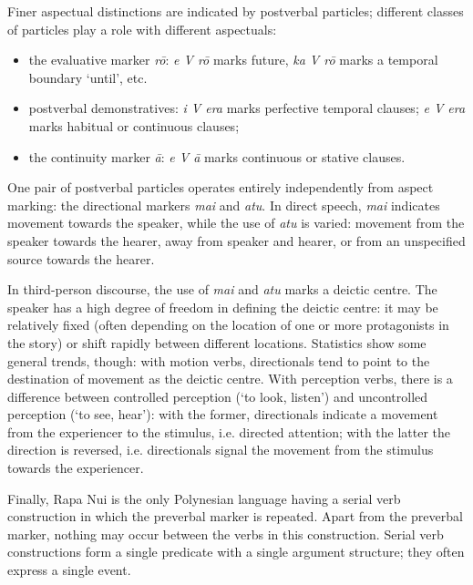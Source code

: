 Finer aspectual distinctions are indicated by postverbal particles; different classes of particles play a role with different aspectuals:

\begin{itemize}
\item 
the evaluative marker \textit{rō}: \textit{e V rō} marks future, \textit{ka V rō} marks a temporal boundary ‘until’, etc.

\item 
postverbal demonstratives: \textit{i V era} marks perfective temporal clauses; \textit{e V era} marks habitual or continuous clauses;

\item 
the continuity marker \textit{{\ꞌ}ā}: \textit{e V {\ꞌ}ā} marks continuous or stative clauses.

\end{itemize}

One pair of postverbal particles operates entirely independently from aspect marking: the directional markers \textit{mai} and \textit{atu}. In direct speech, \textit{mai} indicates movement towards the speaker, while the use of \textit{atu} is varied: movement from the speaker towards the hearer, away from speaker and hearer, or from an unspecified source towards the hearer. 

In third-person discourse, the use of \textit{mai} and \textit{atu} marks a deictic centre. The speaker has a high degree of freedom in defining the deictic centre: it may be relatively fixed (often depending on the location of one or more protagonists in the story) or shift rapidly between different locations. Statistics show some general trends, though: with motion verbs, directionals tend to point to the destination of movement as the deictic centre. With perception verbs, there is a difference between controlled perception (‘to look, listen’) and uncontrolled perception (‘to see, hear’): with the former, directionals indicate a movement from the experiencer to the stimulus, i.e. directed attention; with the latter the direction is reversed, i.e. directionals signal the movement from the stimulus towards the experiencer.

\largerpage[2]
Finally, Rapa Nui is the only Polynesian language having a serial verb construction in which the preverbal marker is repeated. Apart from the preverbal marker, nothing may occur between the verbs in this construction. Serial verb constructions form a single predicate with a single argument structure; they often express a single event.
